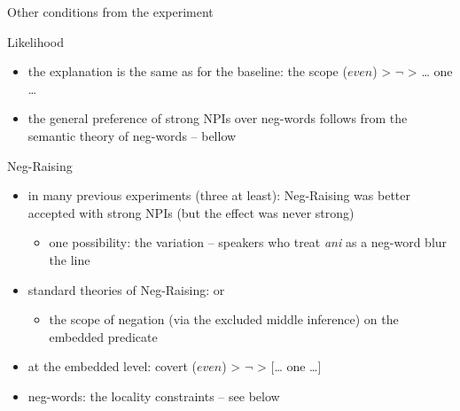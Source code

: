 \documentclass[
  ignorenonframetext,
]{beamer}
\providecommand{\tightlist}{%
  \setlength{\itemsep}{0pt}\setlength{\parskip}{0pt}}
\begin{document}
\begin{frame}
\begin{block}{Other conditions from the experiment}
\protect\hypertarget{other-conditions-from-the-experiment}{}
\begin{block}{Likelihood}
\protect\hypertarget{likelihood}{}
\begin{itemize}
\tightlist
\item
  the explanation is the same as for the baseline: the scope (\(even\))
  \textgreater{} \(\neg\) \textgreater{} \ldots{} one \ldots{}
\item
  the general preference of strong NPIs over neg-words follows from the
  semantic theory of neg-words -- bellow
\end{itemize}
\end{block}

\begin{block}{Neg-Raising}
\protect\hypertarget{neg-raising}{}
\begin{itemize}
\tightlist
\item
  in many previous experiments (three at least): Neg-Raising was better
  accepted with strong NPIs (but the effect was never strong)

  \begin{itemize}
  \tightlist
  \item
    one possibility: the variation -- speakers who treat \emph{ani} as a
    neg-word blur the line
  \end{itemize}
\item
  standard theories of Neg-Raising: \cite{gajewski2007neg} or
  \cite{romoli2013scalar}

  \begin{itemize}
  \tightlist
  \item
    the scope of negation (via the excluded middle inference) on the
    embedded predicate
  \end{itemize}
\item
  at the embedded level: covert (\(even\)) \textgreater{} \(\neg\)
  \textgreater{} {[}\ldots{} one \ldots{]}
\item
  neg-words: the locality constraints -- see below
\end{itemize}
\end{block}
\end{block}
\end{frame}
\end{document}
